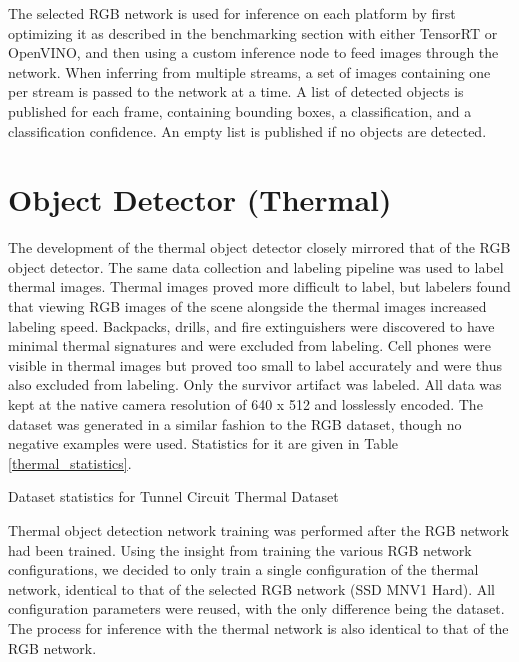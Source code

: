 The selected RGB network is used for inference on each platform by first optimizing it as described in the benchmarking section with either TensorRT or OpenVINO, and then using a custom inference node to feed images through the network. When inferring from multiple streams, a set of images containing one per stream is passed to the network at a time. A list of detected objects is published for each frame, containing bounding boxes, a classification, and a classification confidence. An empty list is published if no objects are detected.

\section{Object Detector (Thermal)}

The development of the thermal object detector closely mirrored that of the RGB object detector. The same data collection and labeling pipeline was used to label thermal images. Thermal images proved more difficult to label, but labelers found that viewing RGB images of the scene alongside the thermal images increased labeling speed. Backpacks, drills, and fire extinguishers were discovered to have minimal thermal signatures and were excluded from labeling. Cell phones were visible in thermal images but proved too small to label accurately and were thus also excluded from labeling. Only the survivor artifact was labeled. All data was kept at the native camera resolution of 640 x 512 and losslessly encoded. The dataset was generated in a similar fashion to the RGB dataset, though no negative examples were used. Statistics for it are given in Table \ref{thermal_statistics}.

\begin{table}
	\centering
	\begin{adjustbox}{max width=.9\textwidth}
	\end{adjustbox}
	\caption{Dataset statistics for Tunnel Circuit Thermal Dataset}
	\label{thermal_statistics}
\end{table}

Thermal object detection network training was performed after the RGB network had been trained. Using the insight from training the various RGB network configurations, we decided to only train a single configuration of the thermal network, identical to that of the selected RGB network (SSD MNV1 Hard). All configuration parameters were reused, with the only difference being the dataset. The process for inference with the thermal network is also identical to that of the RGB network.

